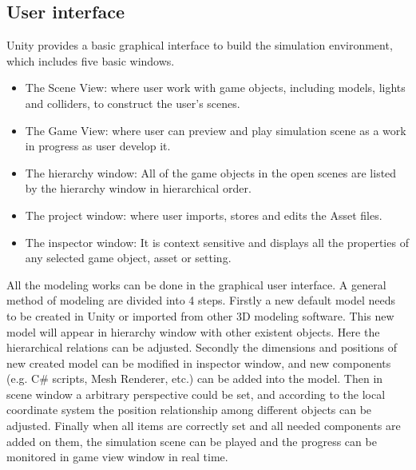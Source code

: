 \subsection{User interface}
Unity provides a basic graphical interface to build the simulation environment, which includes five basic windows. 
\begin{itemize}
	\item The Scene View: where user work with game objects, including models, lights and colliders, to construct the user's scenes. 
	\item The Game View: where user can preview and play simulation scene as a work in progress as user develop it.
	\item The hierarchy window: All of the game objects in the open scenes are listed by the hierarchy window in hierarchical order.
	\item The project window: where user imports, stores and edits the Asset files. 
	\item The inspector window: It is context sensitive and displays all the properties of any selected game object, asset or setting.
\end{itemize} 
All the modeling works can be done in the graphical user interface. A general method of modeling are divided into 4 steps. Firstly a new default model needs to be created in Unity or imported from other 3D modeling software. This new model will appear in hierarchy window with other existent objects. Here the hierarchical relations can be adjusted. Secondly the dimensions and positions of new created model can be modified in inspector window, and new components (e.g. C\# scripts, Mesh Renderer, etc.) can be added into the model. Then in scene window a arbitrary perspective could be set, and according to the local coordinate system the position relationship among different objects can be adjusted. Finally when all items are correctly set and all needed components are added on them, the simulation scene can be played and the progress can be monitored in game view window in real time.
